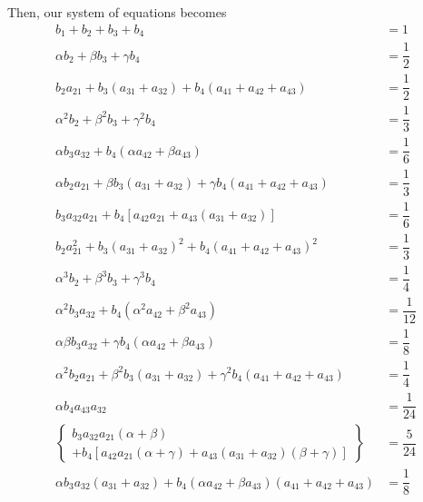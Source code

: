 \documentclass[a4paper,oneside]{book}
\numberwithin{equation}{chapter}
\begin{document}
Then, our system of equations becomes
\begin{align}
{b_1} + {b_2} + {b_3} + {b_4} &= 1\label{4.128}\\
\alpha {b_2} + \beta {b_3} + \gamma {b_4} &= \dfrac{1}{2}\\
{b_2}{a_{21}} + {b_3}\left( {{a_{31}} + {a_{32}}} \right) + {b_4}\left( {{a_{41}} + {a_{42}} + {a_{43}}} \right) &= \dfrac{1}{2}\\
{\alpha ^2}{b_2} + {\beta ^2}{b_3} + {\gamma ^2}{b_4} &= \dfrac{1}{3}\\
\alpha {b_3}{a_{32}} + {b_4}\left( {\alpha {a_{42}} + \beta {a_{43}}} \right) &= \dfrac{1}{6}\\
\alpha {b_2}{a_{21}} + \beta {b_3}\left( {{a_{31}} + {a_{32}}} \right) + \gamma {b_4}\left( {{a_{41}} + {a_{42}} + {a_{43}}} \right) &= \dfrac{1}{3}\\
{b_3}{a_{32}}{a_{21}} + {b_4}\left[ {{a_{42}}{a_{21}} + {a_{43}}\left( {{a_{31}} + {a_{32}}} \right)} \right] &= \dfrac{1}{6}\\
{b_2}a_{21}^2 + {b_3}{\left( {{a_{31}} + {a_{32}}} \right)^2} + {b_4}{\left( {{a_{41}} + {a_{42}} + {a_{43}}} \right)^2} &= \dfrac{1}{3}\\
{\alpha ^3}{b_2} + {\beta ^3}{b_3} + {\gamma ^3}{b_4} &= \dfrac{1}{4}\\
{\alpha ^2}{b_3}{a_{32}} + {b_4}\left( {{\alpha ^2}{a_{42}} + {\beta ^2}{a_{43}}} \right) &= \dfrac{1}{{12}}\\
\alpha \beta {b_3}{a_{32}} + \gamma {b_4}\left( {\alpha {a_{42}} + \beta {a_{43}}} \right) &= \dfrac{1}{8}\\
{\alpha ^2}{b_2}{a_{21}} + {\beta ^2}{b_3}\left( {{a_{31}} + {a_{32}}} \right) + {\gamma ^2}{b_4}\left( {{a_{41}} + {a_{42}} + {a_{43}}} \right) &= \dfrac{1}{4}\\
\alpha {b_4}{a_{43}}{a_{32}} &= \dfrac{1}{{24}}\\
\left\{ {\begin{array}{*{20}{l}}
{{b_3}{a_{32}}{a_{21}}\left( {\alpha  + \beta } \right)}\\
{ + {b_4}\left[ {{a_{42}}{a_{21}}\left( {\alpha  + \gamma } \right) + {a_{43}}\left( {{a_{31}} + {a_{32}}} \right)\left( {\beta  + \gamma } \right)} \right]}
\end{array}} \right\} &= \dfrac{5}{{24}}\\
\alpha {b_3}{a_{32}}\left( {{a_{31}} + {a_{32}}} \right) + {b_4}\left( {\alpha {a_{42}} + \beta {a_{43}}} \right)\left( {{a_{41}} + {a_{42}} + {a_{43}}} \right) &= \dfrac{1}{8}\\

\end{align}
\end{document}
